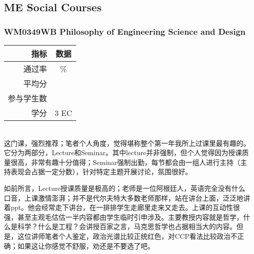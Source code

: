 \vspace{\betsubsec} %
\subsection{ME Social Courses}
\subsubsection{WM0349WB Philosophy of Engineering Science and Design}
\begin{minipage}{0.45\textwidth}
\centering
{}
\end{minipage}%
\begin{minipage}{0.45\textwidth}
\raggedleft
\begin{tabular}{r|c}
\textbf{指标} & \textbf{数据} \\ \hline
通过率 & \% \\ 
平均分 &  \\ 
参与学生数 &  \\
学分 & 3 EC\\
\end{tabular}
\end{minipage}\\

这门课，强烈推荐；笔者个人角度，觉得堪称整个第一年我所上过课里最有趣的。它分为两部分，Lecture和Seminar。其中lecture并非强制，但个人觉得因为授课质量很高，非常有趣十分值得；Seminar强制出勤，每节都会由一组人进行主持（主持表现会占据一定分数），针对特定主题开展讨论，氛围很好。

如前所言，Lecture授课质量是极高的；老师是一位阿根廷人，英语完全没有什么口音，上课激情澎湃；并不是代尔夫特大多数老师那样，站在讲台上面，泛泛地讲着ppt。他会经常走下讲台，在一排排学生走廊里走来又走去。上课的互动性很强，甚至主观毛估估一半内容都由学生临时引申涉及。主要教授内容就是哲学，什么是科学？什么是工程？会讲授百家之言，马克思哲学也占据相当大的内容。但是，这位讲师笔者个人鉴定，政治光谱比较正统红色，对CCP看法比较政治不正确；如果这让你感觉不舒服，劝还是不要选了吧。

